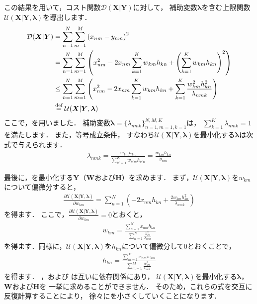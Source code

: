 この結果を用いて，コスト関数$\mathcal{D}(\bm{X}|\bm{Y})$に対して，
補助変数$\bm\lambda$を含む上限関数$\mathcal{U}(\bm{X}|\bm{Y},\bm\lambda)$を導出します．
\begin{align}
\mathcal{D}(\bm{X}|\bm{Y}) 
&= \sum_{n=1}^N \sum_{m=1}^M \left(x_{nm} - y_{nm}\right)^2
\nonumber\\
&= \sum_{n=1}^N \sum_{m=1}^M \left(x_{nm}^2 - 2 x_{nm} \sum_{k=1}^K w_{km}h_{kn} + \left(\sum_{k=1}^K w_{km} h_{kn}\right)^2\right)
\nonumber\\
&\le \sum_{n=1}^N \sum_{m=1}^M \left(x_{nm}^2 - 2 x_{nm} \sum_{k=1}^K w_{km}h_{kn} 
   + \sum_{k=1}^K \frac{w_{km}^2 h_{kn}^2}{\lambda_{nmk}}\right)
\nonumber\\
&\overset{\mbox{\scriptsize{def}}}{=} \mathcal{U}(\bm{X}|\bm{Y},\bm\lambda)
\label{eqn:eu_nmf_u}
\end{align}
ここで，を用いました．
補助変数$\bm\lambda=\{\lambda_{nmk}\}_{n=1,m=1,k=1}^{N,M,K}$は，
$\sum_{k=1}^K \lambda_{nmk} = 1$を満たします．
また，等号成立条件，
すなわち$\mathcal{U}(\bm{X}|\bm{Y},\bm\lambda)$を最小化する$\bm\lambda$は次式で与えられます．
\begin{align}
\lambda_{nmk} 
= \frac{w_{km}h_{kn}}{\sum_{k'=1}^K w_{k'm}h_{k'n}}
= \frac{w_{km}h_{kn}}{y_{nm}}
\label{eqn:eu_nmf_mu_lambda}
\end{align}

最後に，を最小化する$\bm{Y}$（$\bm{W}$および$\bm{H}$）を求めます．
まず，$\mathcal{U}(\bm{X}|\bm{Y},\bm\lambda)$を$w_{km}$について偏微分すると，
\begin{align}
\frac{\partial \mathcal{U}(\bm{X}|\bm{Y},\bm\lambda)}{\partial w_{km}} 
= \sum_{n=1}^N \left(- 2 x_{nm} h_{kn} + \frac{2 w_{km} h_{kn}^2}{\lambda_{nmk}}\right)
\end{align}
を得ます．
ここで，$\frac{\partial \mathcal{U}(\bm{X}|\bm{Y},\bm\lambda)}{\partial w_{km}}=0$とおくと，
\begin{align}
w_{km} 
= \frac{\sum_{n=1}^N x_{nm} h_{kn}}{\sum_{n=1}^N \frac{h_{kn}^2}{\lambda_{nmk}}}
\label{eqn:eu_nmf_mu_w}
\end{align}
を得ます．同様に，$\mathcal{U}(\bm{X}|\bm{Y},\bm\lambda)$を$h_{kn}$について偏微分して$0$とおくことで，
\begin{align}
h_{kn} 
= \frac{\sum_{m=1}^M x_{nm} w_{km}}{\sum_{m=1}^M \frac{w_{km}^2}{\lambda_{nmk}}}
\label{eqn:eu_nmf_mu_h}
\end{align}
を得ます．
，および
は互いに依存関係にあり，
$\mathcal{U}(\bm{X}|\bm{Y},\bm\lambda)$を最小化する$\bm\lambda$，$\bm{W}$および$\bm{H}$を
一挙に求めることができません．
そのため，これらの式を交互に反復計算することにより，
徐々にを小さくしていくことになります．

